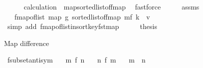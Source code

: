 \begin{isabellebody}
\ \ \ \ \isamarkupfalse%
\ calculation\ \ map{\isacharunderscore}{\kern0pt}sorted{\isacharunderscore}{\kern0pt}list{\isacharunderscore}{\kern0pt}of{\isacharunderscore}{\kern0pt}fmap\ \isamarkupfalse%
\ fastforce\isanewline
\ \ \isamarkupfalse%
\ \isamarkupfalse%
\ assms{\isacharparenleft}{\kern0pt}{}{\isacharcomma}{\kern0pt}{}{\isacharparenright}{\kern0pt}\ \isamarkupfalse%
\ {\isachardoublequoteopen}{\isasymdots}\ {\isacharequal}{\kern0pt}\ {\isacharparenleft}{\kern0pt}fmap{\isacharunderscore}{\kern0pt}of{\isacharunderscore}{\kern0pt}list\ {\isacharparenleft}{\kern0pt}map\ {\isacharquery}{\kern0pt}g\ {\isacharparenleft}{\kern0pt}sorted{\isacharunderscore}{\kern0pt}list{\isacharunderscore}{\kern0pt}of{\isacharunderscore}{\kern0pt}fmap\ m{\isacharparenright}{\kern0pt}{\isacharparenright}{\kern0pt}{\isacharparenright}{\kern0pt}{\isacharparenleft}{\kern0pt}f\ k\ {\isachardollar}{\kern0pt}{\isachardollar}{\kern0pt}{\isacharcolon}{\kern0pt}{\isacharequal}{\kern0pt}\ v{\isacharparenright}{\kern0pt}{\isachardoublequoteclose}\isanewline
\ \ \ \ \isamarkupfalse%
\ {\isacharparenleft}{\kern0pt}simp\ add{\isacharcolon}{\kern0pt}\ fmap{\isacharunderscore}{\kern0pt}of{\isacharunderscore}{\kern0pt}list{\isacharunderscore}{\kern0pt}insort{\isacharunderscore}{\kern0pt}key{\isacharunderscore}{\kern0pt}fst{\isacharunderscore}{\kern0pt}map{\isacharparenright}{\kern0pt}\isanewline
\ \ \isamarkupfalse%
\ \isamarkupfalse%
\ {\isacharquery}{\kern0pt}thesis\ \isacommand{{\isachardot}{\kern0pt}}\isamarkupfalse%
\isanewline
{}\isamarkupfalse%
%
\endisatagproof
{\isafoldproof}%
%
\isadelimproof
%
\endisadelimproof
%
\begin{isamarkuptext}%
Map difference%
\end{isamarkuptext}\isamarkuptrue%
\isamarkupfalse%
\ fsubset{\isacharunderscore}{\kern0pt}antisym{\isacharcolon}{\kern0pt}\isanewline
\ \ \ {\isachardoublequoteopen}m\ {\isasymsubseteq}\isactrlsub f\ n{\isachardoublequoteclose}\isanewline
\ \ \ {\isachardoublequoteopen}n\ {\isasymsubseteq}\isactrlsub f\ m{\isachardoublequoteclose}\isanewline
\ \ \ {\isachardoublequoteopen}m\ {\isacharequal}{\kern0pt}\ n{\isachardoublequoteclose}\isanewline
%
\isadelimproof
%
\endisadelimproof
%
\isatagproof
{}\isamarkupfalse%
\ {\isacharminus}{\kern0pt}\isanewline
\ \ \isamarkupfalse%

\end{isabellebody}
